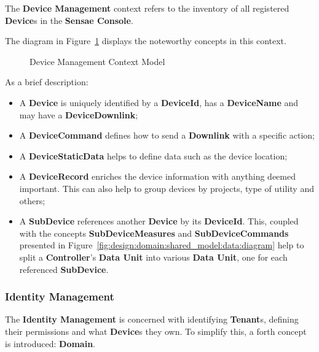 The \textbf{Device Management} context refers to the inventory of all registered \textbf{Device}s in the \textbf{Sensae Console}.

The diagram in Figure~\ref{fig:design:domain:bounded_contexts:device:diagram} displays the noteworthy concepts in this context.

\begin{figure}[H]
   \centering
  \resizebox{\columnwidth}{!}
  {
     
  }
  \caption[Device Management Context Model]{Device Management Context Model}
  \label{fig:design:domain:bounded_contexts:device:diagram}
\end{figure}

As a brief description:

\begin{itemize}
   \item A \textbf{Device} is uniquely identified by a \textbf{DeviceId}, has a \textbf{DeviceName} and may have a \textbf{DeviceDownlink};
   \item A \textbf{DeviceCommand} defines how to send a \textbf{Downlink} with a specific action;
   \item A \textbf{DeviceStaticData} helps to define data such as the device location;
   \item A \textbf{DeviceRecord} enriches the device information with anything deemed important. This can also help to group devices by projects, type of utility and others;
   \item A \textbf{SubDevice} references another \textbf{Device} by its \textbf{DeviceId}. This, coupled with the concepts \textbf{SubDeviceMeasures} and \textbf{SubDeviceCommands} presented in Figure~\ref{fig:design:domain:shared_model:data:diagram} help to split a \textbf{Controller}'s \textbf{Data Unit} into various \textbf{Data Unit}, one for each referenced \textbf{SubDevice}.
\end{itemize}

\subsubsection{Identity Management}
\label{subsubsec:design:domain:bounded_contexts:identity}

The \textbf{Identity Management} is concerned with identifying \textbf{Tenant}s, defining their permissions and what \textbf{Device}s they own.
To simplify this, a forth concept is introduced: \textbf{Domain}.

